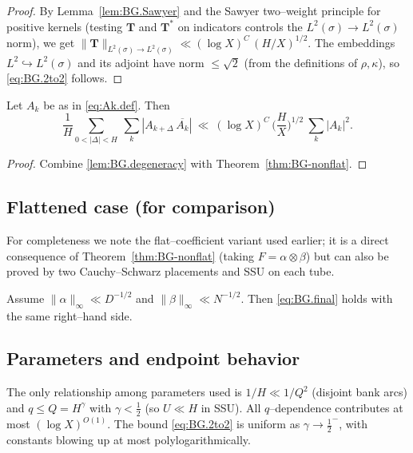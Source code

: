 \begin{proof}
By Lemma~\ref{lem:BG.Sawyer} and the Sawyer two–weight principle for positive kernels (testing $\mathbf T$ and $\mathbf T^\ast$ on indicators controls the $L^2(\sigma)\!\to\!L^2(\sigma)$ norm), we get
$\|\mathbf T\|_{L^2(\sigma)\to L^2(\sigma)}\ll (\log X)^C\,(H/X)^{1/2}$. The embeddings $L^2\hookrightarrow L^2(\sigma)$ and its adjoint have norm $\le \sqrt{2}$ (from the definitions of $\rho,\kappa$), so \eqref{eq:BG.2to2} follows.
\end{proof}

\begin{corollary}\label{cor:BG.AA}
Let $A_k$ be as in \eqref{eq:Ak.def}. Then
\begin{equation}\label{eq:BG.final}
\frac{1}{H}\sum_{0<|\Delta|<H}\ \sum_k |A_{k+\Delta}\,\overline{A_k}|
\ \ll\ (\log X)^C\,\Big(\frac{H}{X}\Big)^{1/2}\ \sum_k |A_k|^2.
\end{equation}
\end{corollary}

\begin{proof}
Combine \eqref{lem:BG.degeneracy} with Theorem~\ref{thm:BG-nonflat}.
\end{proof}

\subsection{Flattened case (for comparison)}\label{subsec:BG.flat}

For completeness we note the flat–coefficient variant used earlier; it is a direct consequence of Theorem~\ref{thm:BG-nonflat} (taking $F=\alpha\!\otimes\!\beta$) but can also be proved by two Cauchy–Schwarz placements and SSU on each tube.

\begin{proposition}\label{prop:BG.flat}
Assume $\|\alpha\|_\infty\ll D^{-1/2}$ and $\|\beta\|_\infty\ll N^{-1/2}$. Then \eqref{eq:BG.final} holds with the same right–hand side.
\end{proposition}

\subsection{Parameters and endpoint behavior}\label{subsec:BG.params}

The only relationship among parameters used is $1/H \ll 1/Q^2$ (disjoint bank arcs) and $q\le Q=H^\gamma$ with $\gamma<\tfrac12$ (so $U\ll H$ in SSU). All $q$–dependence contributes at most $(\log X)^{O(1)}$. The bound \eqref{eq:BG.2to2} is uniform as $\gamma\to \tfrac12^-$, with constants blowing up at most polylogarithmically.

